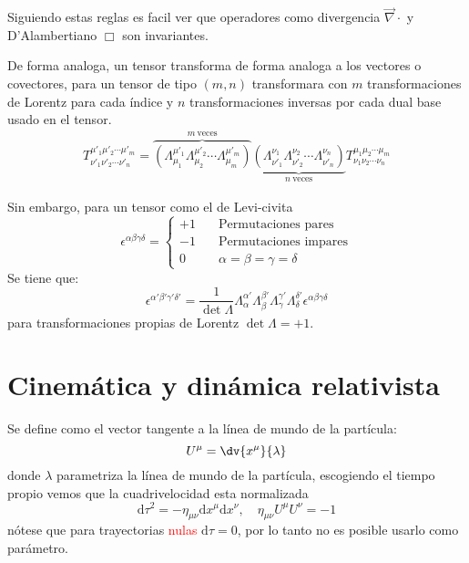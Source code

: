 \documentclass[../main]{subfiles}
\begin{document}
\begin{adjustwidth}{0pt}{-100pt}
Siguiendo estas reglas es facil ver que operadores como divergencia $\vec{\nabla}\cdot$ y D'Alambertiano $\Box$ son invariantes.

De forma analoga, un tensor transforma de forma analoga a los vectores o covectores, para un tensor de tipo $(m, n)$ transformara con $m$ transformaciones de Lorentz para cada índice y $n$ transformaciones inversas por cada dual base usado en el tensor.
\begin{equation}
    \begin{aligned}
        T^{\mu'_1 \mu'_2 \cdots \mu'_m}_{\nu'_1 \nu'_2 \cdots \nu'_n}=\overbrace{\left(\Lambda^{\mu'_1}_{\mu_1} \Lambda^{\mu'_2}_{\mu_2}\cdots \Lambda^{\mu'_m}_{\mu_m}\right)}^{m \ \text{veces}} \underbrace{\left(\Lambda^{\nu_1}_{\nu'_1}\Lambda^{\nu_2}_{\nu'_2}\cdots \Lambda^{\nu_n}_{\nu'_n}\right)}_{n \ \text{veces}} T^{\mu_1\mu_2 \cdots \mu_m}_{\nu_1\nu_2\cdots \nu_n}
    \end{aligned}
\end{equation}

Sin embargo, para un tensor como el de Levi-civita
\begin{equation}
    \epsilon^{\alpha\beta\gamma\delta}=
    \left\{
    \begin{aligned}
        +1 &\quad \text{Permutaciones pares}\\
        -1 &\quad \text{Permutaciones impares}\\
        0  &\quad \alpha=\beta=\gamma=\delta
    \end{aligned}
    \right.
\end{equation}
Se tiene que:
\begin{equation}
    \epsilon^{\alpha' \beta' \gamma' \delta'}=\dfrac{1}{\det \Lambda} \Lambda^{\alpha'}_{\alpha} \Lambda^{\beta'}_{\beta} \Lambda^{\gamma'}_{\gamma} \Lambda^{\delta'}_{\delta}\epsilon^{\alpha\beta\gamma\delta}
\end{equation}
para transformaciones propias de Lorentz $\det \Lambda=+1$.

\section{Cinemática y dinámica relativista}\label{part2.6}
 Se define como el vector tangente a la línea de mundo de la partícula:
\begin{equation}
    U^{\mu}=\dv{x^{\mu}}{\lambda}
\end{equation}
donde $\lambda$ parametriza la línea de mundo de la partícula, escogiendo el tiempo propio vemos que la cuadrivelocidad esta normalizada
\begin{equation}
    \mathrm{d}\tau^2=-\eta_{\mu\nu} \mathrm{d}x^{\mu}\mathrm{d}x^{\nu},\quad \eta_{\mu\nu}U^{\mu}U^{\nu}=-1
\end{equation}
nótese que para trayectorias \textcolor{red}{nulas} $\mathrm{d}\tau=0$, por lo tanto no es posible usarlo como parámetro.


\end{adjustwidth}
\end{document}
